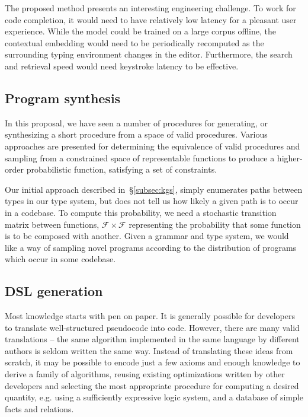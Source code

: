 \documentclass[11pt]{article}
\begin{document}
    The proposed method presents an interesting engineering challenge. To work for code completion, it would need to have relatively low latency for a pleasant user experience. While the model could be trained on a large corpus offline, the contextual embedding would need to be periodically recomputed as the surrounding typing environment changes in the editor. Furthermore, the search and retrieval speed would need keystroke latency to be effective.

    \pagebreak\subsection{Program synthesis}\label{subsec:synthesis}

    In this proposal, we have seen a number of procedures for generating, or synthesizing a short procedure from a space of valid procedures. Various approaches are presented for determining the equivalence of valid procedures and sampling from a constrained space of representable functions to produce a higher-order probabilistic function, satisfying a set of constraints.

    Our initial approach described in~\S\ref{subsec:kgs}, simply enumerates paths between types in our type system, but does not tell us how likely a given path is to occur in a codebase. To compute this probability, we need a stochastic transition matrix between functions, $\mathcal{F}\times\mathcal{F}$ representing the probability that some function is to be composed with another. Given a grammar and type system, we would like a way of sampling novel programs according to the distribution of programs which occur in some codebase.

    \subsection{DSL generation}\label{subsec:gen}

    Most knowledge starts with pen on paper. It is generally possible for developers to translate well-structured pseudocode into code. However, there are many valid translations -- the same algorithm implemented in the same language by different authors is seldom written the same way. Instead of translating these ideas from scratch, it may be possible to encode just a few axioms and enough knowledge to derive a family of algorithms, reusing existing optimizations written by other developers and selecting the most appropriate procedure for computing a desired quantity, e.g. using a sufficiently expressive logic system, and a database of simple facts and relations.
\end{document}
